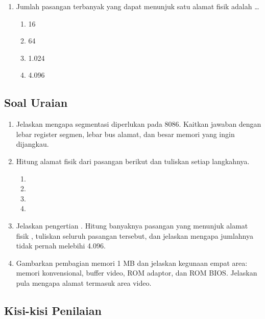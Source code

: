 \begin{enumerate}
    \item Jumlah pasangan  terbanyak yang dapat
          menunjuk satu alamat fisik adalah \dots
          \begin{enumerate}
              \item 16 \item 64
              \item 1.024 \item 4.096
          \end{enumerate}
\end{enumerate}

\subsection{Soal Uraian}

\begin{enumerate}
    \item Jelaskan mengapa segmentasi diperlukan pada 8086. Kaitkan
          jawaban dengan lebar register segmen, lebar bus alamat,
          dan besar memori yang ingin dijangkau.

    \item Hitung alamat fisik dari pasangan berikut dan tuliskan
          setiap langkahnya.
          \begin{enumerate}
              \item {}
              \item {}
              \item {}
              \item {}
          \end{enumerate}

    \item Jelaskan pengertian . Hitung
          banyaknya pasangan yang menunjuk alamat fisik
          , tuliskan seluruh pasangan tersebut, dan
          jelaskan mengapa jumlahnya tidak pernah melebihi 4.096.

    \item Gambarkan pembagian memori 1 MB dan jelaskan kegunaan
          empat area: memori konvensional, buffer video, ROM
          adaptor, dan ROM BIOS. Jelaskan pula mengapa alamat
           termasuk area video.
\end{enumerate}

\subsection{Kisi-kisi Penilaian}

